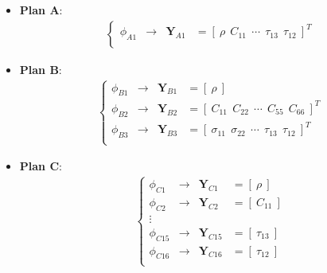 \documentclass[12pt]{extbook}
\begin{document}
\begin{itemize}
\item {\bf Plan A}:
\begin{equation}
\begin{split}
\left\{
\begin{array}{llll}
\phi_{A1} & \to & \bm{Y}_{A1} & = [~\rho~~C_{11}~~\cdots~~\tau_{13}~~\tau_{12}~]^T\\
\end{array}
\right.
\end{split}
\label{2-1-T2}
\end{equation}
\item {\bf Plan B}:
\begin{equation}
\begin{split}
\left\{
\begin{array}{llll}
\phi_{B1} & \to & \bm{Y}_{B1} & = [~\rho~]\\
\phi_{B2} & \to & \bm{Y}_{B2} & = [~C_{11}~~C_{22}~~\cdots~~C_{55}~~C_{66}~]^T\\
\phi_{B3} & \to & \bm{Y}_{B3} & = [~\sigma_{11}~~\sigma_{22}~~\cdots~~\tau_{13}~~\tau_{12}~]^T\\
\end{array}
\right.
\end{split}
\label{2-1-T3}
\end{equation}
\item {\bf Plan C}:
\begin{equation}
\begin{split}
\left\{
\begin{array}{llll}
\phi_{C1} & \to & \bm{Y}_{C1} & = [~\rho~]\\
\phi_{C2} & \to & \bm{Y}_{C2} & = [~C_{11}~]\\
\vdots & & & \\
\phi_{C15} & \to & \bm{Y}_{C15} & = [~\tau_{13}~]\\
\phi_{C16} & \to & \bm{Y}_{C16} & = [~\tau_{12}~]\\
\end{array}
\right.
\end{split}
\label{2-1-T4}
\end{equation}
\end{itemize}
\end{document}
